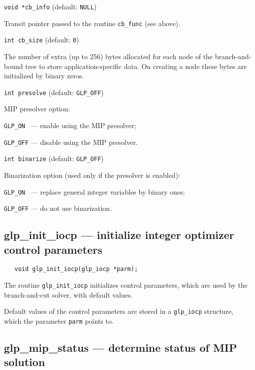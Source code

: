 \bigskip

{\tt void *cb\_info} (default: {\tt NULL})

Transit pointer passed to the routine \verb|cb_func| (see above).

\bigskip

{\tt int cb\_size} (default: {\tt 0})

The number of extra (up to 256) bytes allocated for each node of the
branch-and-bound tree to store application-specific data. On creating
a node these bytes are initialized by binary zeros.

\bigskip

{\tt int presolve} (default: {\tt GLP\_OFF})

MIP presolver option:

\verb|GLP_ON | --- enable using the MIP presolver;

\verb|GLP_OFF| --- disable using the MIP presolver.

\newpage

{\tt int binarize} (default: {\tt GLP\_OFF})

Binarization option (used only if the presolver is enabled):

\verb|GLP_ON | --- replace general integer variables by binary ones;

\verb|GLP_OFF| --- do not use binarization.

\subsection{glp\_init\_iocp --- initialize integer optimizer control
parameters}

\synopsis

\begin{verbatim}
   void glp_init_iocp(glp_iocp *parm);
\end{verbatim}

\description

The routine \verb|glp_init_iocp| initializes control parameters, which
are used by the branch-and-cut solver, with default values.

Default values of the control parameters are stored in
a \verb|glp_iocp| structure, which the parameter \verb|parm| points to.

\subsection{glp\_mip\_status --- determine status of MIP solution}

